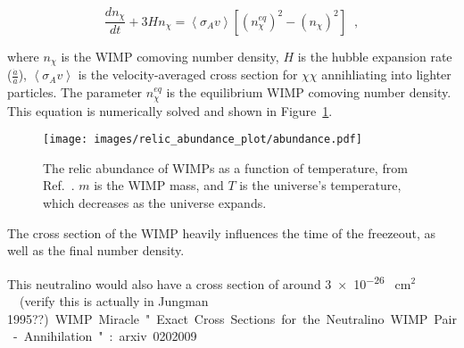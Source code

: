   \begin{equation}\label{eqn:boltzmann_relic}
  \frac{dn_{\chi}}{dt} + 3 H n_{\chi} = \left \langle \sigma_{A} v \right \rangle \left [ \left ( n^{eq}_{\chi} \right )^2 - \left ( n_{\chi} \right )^2 \right ] \;\;,
  \end{equation}
  
  where $n_\chi$ is the WIMP comoving number density, $H$ is the hubble expansion rate ($\frac{\dot{a}}{a}$), $\left \langle \sigma_{A} v \right \rangle$ is the velocity-averaged cross section for $\chi\chi$ annihliating into lighter particles.
  The parameter $n^{eq}_{\chi}$ is the equilibrium WIMP comoving number density.
  This equation is numerically solved and shown in Figure~\ref{fig:abundance}.
  
  \begin{figure}[ht]
    \centering
    \texttt{[image: images/relic\_abundance\_plot/abundance.pdf]}
    \caption[Relic Abundance vs Time]{
      The relic abundance of WIMPs as a function of temperature, from Ref.~\cite{Jungman:1995df}.
      $m$ is the WIMP mass, and $T$ is the universe's temperature, which decreases as the universe expands.
    }
    \label{fig:abundance}
  \end{figure}
  

  The cross section of the WIMP heavily influences the time of the freezeout, as well as the final number density.
  
  This neutralino would also have a cross section of around \nicetilde{} \SI{3e-26}{ cm${}^2$ }~\cite{Jungman:1995df} {\color{red}(verify this is actually in Jungman 1995??)}.
  
  WIMP Miracle
  
  "Exact Cross Sections for the Neutralino WIMP Pair-Annihilation" : arxiv 0202009
  

  
  
  
